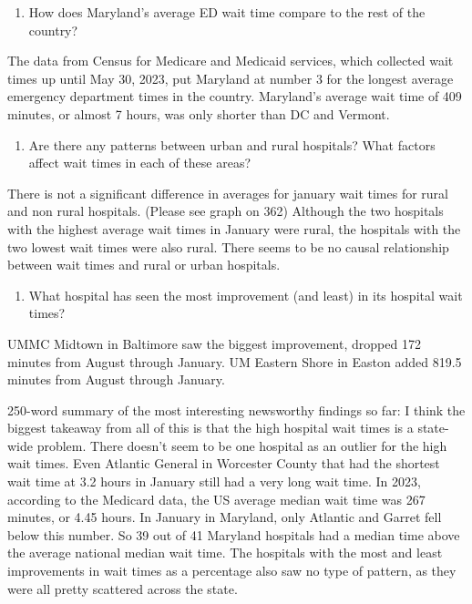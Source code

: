 \documentclass[
  letterpaper,
  DIV=11,
  numbers=noendperiod]{scrartcl}
\providecommand{\tightlist}{%
  \setlength{\itemsep}{0pt}\setlength{\parskip}{0pt}}\usepackage{longtable,booktabs,array}
\begin{document}
\begin{enumerate}
\def\labelenumi{\arabic{enumi}.}
\setcounter{enumi}{2}
\tightlist
\item
  How does Maryland's average ED wait time compare to the rest of the
  country?
\end{enumerate}

The data from Census for Medicare and Medicaid services, which collected
wait times up until May 30, 2023, put Maryland at number 3 for the
longest average emergency department times in the country. Maryland's
average wait time of 409 minutes, or almost 7 hours, was only shorter
than DC and Vermont.

\begin{enumerate}
\def\labelenumi{\arabic{enumi}.}
\setcounter{enumi}{3}
\tightlist
\item
  Are there any patterns between urban and rural hospitals? What factors
  affect wait times in each of these areas?
\end{enumerate}

There is not a significant difference in averages for january wait times
for rural and non rural hospitals. (Please see graph on 362) Although
the two hospitals with the highest average wait times in January were
rural, the hospitals with the two lowest wait times were also rural.
There seems to be no causal relationship between wait times and rural or
urban hospitals.

\begin{enumerate}
\def\labelenumi{\arabic{enumi}.}
\setcounter{enumi}{4}
\tightlist
\item
  What hospital has seen the most improvement (and least) in its
  hospital wait times?
\end{enumerate}

UMMC Midtown in Baltimore saw the biggest improvement, dropped 172
minutes from August through January. UM Eastern Shore in Easton added
819.5 minutes from August through January.

250-word summary of the most interesting newsworthy findings so far: I
think the biggest takeaway from all of this is that the high hospital
wait times is a state-wide problem. There doesn't seem to be one
hospital as an outlier for the high wait times. Even Atlantic General in
Worcester County that had the shortest wait time at 3.2 hours in January
still had a very long wait time. In 2023, according to the Medicard
data, the US average median wait time was 267 minutes, or 4.45 hours. In
January in Maryland, only Atlantic and Garret fell below this number. So
39 out of 41 Maryland hospitals had a median time above the average
national median wait time. The hospitals with the most and least
improvements in wait times as a percentage also saw no type of pattern,
as they were all pretty scattered across the state.
\end{document}
